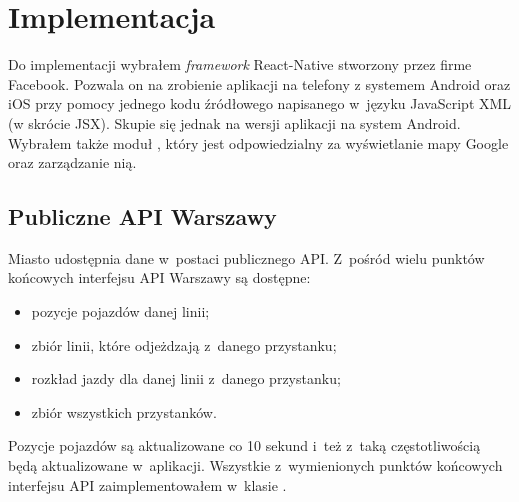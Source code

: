 \documentclass{SGGW-thesis}
\begin{document}
\chapter{Implementacja}
Do implementacji wybrałem \textit{framework} React-Native stworzony przez firme Facebook.
Pozwala on na zrobienie aplikacji na telefony z systemem Android oraz iOS przy pomocy jednego kodu źródłowego napisanego w~języku JavaScript XML (w skrócie JSX).
Skupie się jednak na wersji aplikacji na system Android.
Wybrałem także moduł , który jest odpowiedzialny za wyświetlanie mapy Google oraz zarządzanie nią.

\section{Publiczne API Warszawy}
Miasto udostępnia dane w~postaci publicznego API.
Z~pośród wielu punktów końcowych interfejsu API Warszawy są dostępne:
\begin{itemize}
  \item{pozycje pojazdów danej linii;}
  \item{zbiór linii, które odjeżdzają z~danego przystanku;}
  \item{rozkład jazdy dla danej linii z~danego przystanku;}
  \item{zbiór wszystkich przystanków.}
\end{itemize}
Pozycje pojazdów są aktualizowane co 10 sekund i~też z~taką częstotliwością będą aktualizowane w~aplikacji.
Wszystkie z~wymienionych punktów końcowych interfejsu API zaimplementowałem w~klasie .
\end{document}
